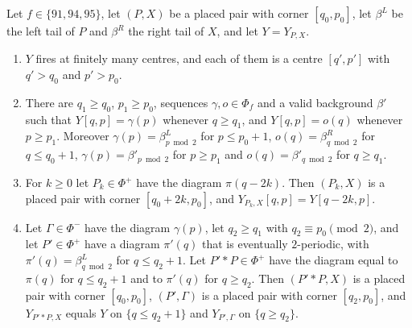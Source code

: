 \begin{lemma}[scattering]\label{cl:lem:scatter}
Let $f\in\{91,94,95\}$, let $(P,X)$ be a placed pair with corner $[q_0,p_0]$, let $\beta^L$ be the left tail of $P$ and $\beta^R$ the right tail of $X$, and let $Y=Y_{P,X}$.
\begin{enumerate}
\item[(i)] $Y$ fires at finitely many centres, and each of them is a centre $[q',p']$ with $q'>q_0$ and $p'>p_0$.
\item[(ii)] There are $q_1\ge q_0$, $p_1\ge p_0$, sequences $\gamma,o\in\Phi_f$ and a valid background $\beta'$ such that $Y[q,p]=\gamma(p)$ whenever $q\ge q_1$, and $Y[q,p]=o(q)$ whenever $p\ge p_1$. Moreover $\gamma(p)=\beta^L_{p\bmod2}$ for $p\le p_0+1$, $o(q)=\beta^R_{q\bmod2}$ for $q\le q_0+1$, $\gamma(p)=\beta'_{p\bmod2}$ for $p\ge p_1$ and $o(q)=\beta'_{q\bmod2}$ for $q\ge q_1$.
\item[(iii)] For $k\ge0$ let $P_k\in\Phi^+$ have the diagram $\pi(q-2k)$. Then $(P_k,X)$ is a placed pair with corner $[q_0+2k,p_0]$, and $Y_{P_k,X}[q,p]=Y[q-2k,p]$.
\item[(iv)] Let $\Gamma\in\Phi^-$ have the diagram $\gamma(p)$, let $q_2\ge q_1$ with $q_2\equiv p_0\pmod2$, and let $P'\in\Phi^+$ have a diagram $\pi'(q)$ that is eventually $2$-periodic, with $\pi'(q)=\beta^L_{q\bmod2}$ for $q\le q_2+1$. Let $P'*P\in\Phi^+$ have the diagram equal to $\pi(q)$ for $q\le q_2+1$ and to $\pi'(q)$ for $q\ge q_2$. Then $(P'*P,X)$ is a placed pair with corner $[q_0,p_0]$, $(P',\Gamma)$ is a placed pair with corner $[q_2,p_0]$, and $Y_{P'*P,X}$ equals $Y$ on $\{q\le q_2+1\}$ and $Y_{P',\Gamma}$ on $\{q\ge q_2\}$.
\end{enumerate}
\end{lemma}

